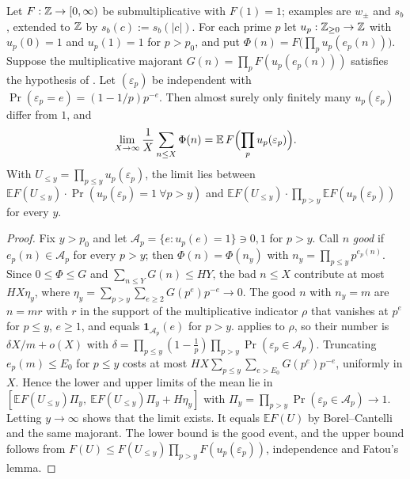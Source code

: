 \documentclass[11pt]{article}
\newcommand{\wpm}{w_{\pm}}
\newcommand{\Ex}{\mathbb E}
\begin{document}
\begin{lemma}\label{lem:model}
Let $F:\mathbb Z\to[0,\infty)$ be submultiplicative with $F(1)=1$; examples are $\wpm$ and $s_b$, extended to $\mathbb Z$ by $s_b(c):=s_b(|c|)$. For each prime $p$ let $u_p:\mathbb Z_{\ge0}\to\mathbb Z$ with $u_p(0)=1$ and $u_p(1)=1$ for $p>p_0$, and put $\Phi(n)=F\bigl(\prod_pu_p(e_p(n))\bigr)$. Suppose the multiplicative majorant $G(n)=\prod_pF(u_p(e_p(n)))$ satisfies the hypothesis of . Let $(\varepsilon_p)$ be independent with $\Pr(\varepsilon_p=e)=(1-1/p)p^{-e}$. Then almost surely only finitely many $u_p(\varepsilon_p)$ differ from $1$, and
\[
\lim_{X\to\infty}\frac1X\sum_{n\le X}\Phi(n)=\Ex\,F\Bigl(\prod_pu_p(\varepsilon_p)\Bigr).
\]
With $U_{\le y}=\prod_{p\le y}u_p(\varepsilon_p)$, the limit lies between $\Ex F(U_{\le y})\cdot\Pr(u_p(\varepsilon_p)=1\ \forall p>y)$ and $\Ex F(U_{\le y})\cdot\prod_{p>y}\Ex F(u_p(\varepsilon_p))$ for every $y$.
\end{lemma}

\begin{proof}
Fix $y>p_0$ and let $\mathcal A_p=\{e:u_p(e)=1\}\ni0,1$ for $p>y$. Call $n$ \emph{good} if $e_p(n)\in\mathcal A_p$ for every $p>y$; then $\Phi(n)=\Phi(n_y)$ with $n_y=\prod_{p\le y}p^{e_p(n)}$. Since $0\le\Phi\le G$ and $\sum_{n\le Y}G(n)\le HY$, the bad $n\le X$ contribute at most $HX\eta_y$, where $\eta_y=\sum_{p>y}\sum_{e\ge2}G(p^e)p^{-e}\to0$. The good $n$ with $n_y=m$ are $n=mr$ with $r$ in the support of the multiplicative indicator $\rho$ that vanishes at $p^e$ for $p\le y$, $e\ge1$, and equals $\mathbf 1_{\mathcal A_p}(e)$ for $p>y$.  applies to $\rho$, so their number is $\delta X/m+o(X)$ with $\delta=\prod_{p\le y}(1-\frac1p)\prod_{p>y}\Pr(\varepsilon_p\in\mathcal A_p)$. Truncating $e_p(m)\le E_0$ for $p\le y$ costs at most $HX\sum_{p\le y}\sum_{e>E_0}G(p^e)p^{-e}$, uniformly in $X$. Hence the lower and upper limits of the mean lie in $[\Ex F(U_{\le y})\Pi_y,\ \Ex F(U_{\le y})\Pi_y+H\eta_y]$ with $\Pi_y=\prod_{p>y}\Pr(\varepsilon_p\in\mathcal A_p)\to1$. Letting $y\to\infty$ shows that the limit exists. It equals $\Ex F(U)$ by Borel--Cantelli and the same majorant. The lower bound is the good event, and the upper bound follows from $F(U)\le F(U_{\le y})\prod_{p>y}F(u_p(\varepsilon_p))$, independence and Fatou's lemma.
\end{proof}
\end{document}
